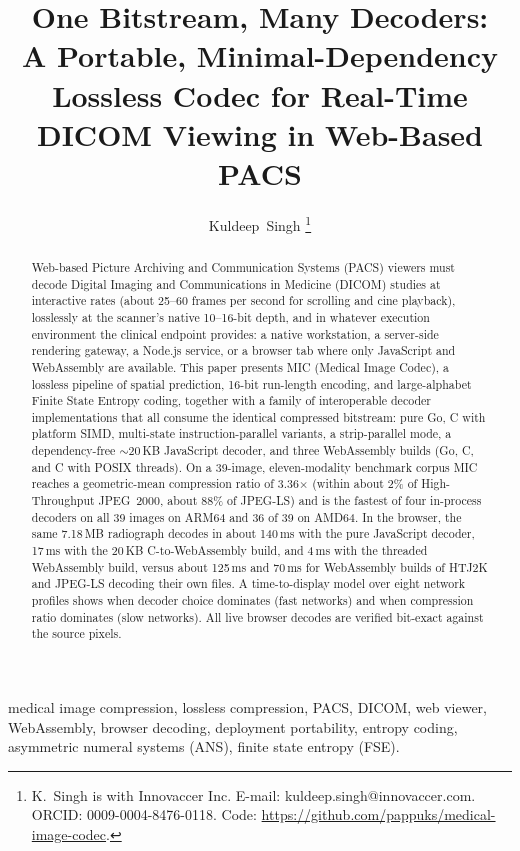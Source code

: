 \documentclass[journal]{IEEEtran}
\title{One Bitstream, Many Decoders:\\
       A Portable, Minimal-Dependency Lossless Codec for
       Real-Time DICOM Viewing in Web-Based PACS}
\author{Kuldeep~Singh%
\thanks{K.\ Singh is with Innovaccer Inc.
E-mail: kuldeep.singh@innovaccer.com.
ORCID: 0009-0004-8476-0118.
Code: \url{https://github.com/pappuks/medical-image-codec}.}%
}
\begin{document}
\maketitle

\begin{abstract}
Web-based Picture Archiving and Communication Systems (PACS) viewers must
decode Digital Imaging and Communications in Medicine (DICOM) studies at
interactive rates (about 25--60 frames per second for scrolling and cine
playback), losslessly at the scanner's native 10--16-bit depth, and in whatever
execution environment the clinical endpoint provides: a native workstation, a
server-side rendering gateway, a Node.js service, or a browser tab where only
JavaScript and WebAssembly are available. This paper presents MIC (Medical
Image Codec), a lossless pipeline of spatial prediction, 16-bit run-length
encoding, and large-alphabet Finite State Entropy coding, together with a
family of interoperable decoder implementations that all consume the identical
compressed bitstream: pure Go, C with platform SIMD, multi-state
instruction-parallel variants, a strip-parallel mode, a dependency-free
${\sim}$20\,KB JavaScript decoder, and three WebAssembly builds (Go, C, and C
with POSIX threads). On a 39-image, eleven-modality benchmark corpus MIC
reaches a geometric-mean compression ratio of 3.36$\times$ (within about 2\% of
High-Throughput JPEG~2000, about 88\% of JPEG-LS) and is the fastest of four
in-process decoders on all 39 images on ARM64 and 36 of 39 on AMD64. In the
browser, the same 7.18\,MB radiograph decodes in about 140\,ms with the pure
JavaScript decoder, 17\,ms with the 20\,KB C-to-WebAssembly build, and 4\,ms
with the threaded WebAssembly build, versus about 125\,ms and 70\,ms for
WebAssembly builds of HTJ2K and JPEG-LS decoding their own files. A
time-to-display model over eight network profiles shows when decoder choice
dominates (fast networks) and when compression ratio dominates (slow networks).
All live browser decodes are verified bit-exact against the source pixels.
\end{abstract}

\begin{IEEEkeywords}
medical image compression, lossless compression, PACS, DICOM, web viewer,
WebAssembly, browser decoding, deployment portability, entropy coding,
asymmetric numeral systems (ANS), finite state entropy (FSE).
\end{IEEEkeywords}
\end{document}
